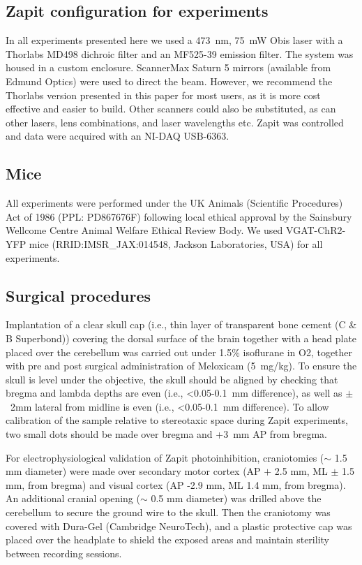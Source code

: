\documentclass[9pt,lineno]{elife}
\begin{document}
\subsection{Zapit configuration for experiments}
In all experiments presented here we used a 473~nm, 75~mW Obis laser with a Thorlabs MD498 dichroic filter and an MF525-39 emission filter.
The system was housed in a custom enclosure.
ScannerMax Saturn 5 mirrors (available from Edmund Optics) were used to direct the beam.
However, we recommend the Thorlabs version presented in this paper for most users, as it is more cost effective and easier to build.
Other scanners could also be substituted, as can other lasers, lens combinations, and laser wavelengths etc.
Zapit was controlled and data were acquired with an NI-DAQ USB-6363.

\subsection{Mice}
All experiments were performed under the UK Animals (Scientific Procedures) Act of 1986 (PPL: PD867676F) following local ethical approval by the Sainsbury Wellcome Centre Animal Welfare Ethical Review Body.
We used VGAT-ChR2-YFP mice (RRID:IMSR\_JAX:014548, Jackson Laboratories, USA) for all experiments.

\subsection{Surgical procedures}
Implantation of a clear skull cap (i.e., thin layer of transparent bone cement (C \& B Superbond)) covering the dorsal surface of the brain together with a head plate placed over the cerebellum was carried out under 1.5\% isoflurane in O2, together with pre and post surgical administration of Meloxicam (5~mg/kg).
To ensure the skull is level under the objective, the skull should be aligned by checking that bregma and lambda depths are even (i.e., <0.05-0.1~mm difference), as well as $\pm$~2mm lateral from midline is even (i.e., <0.05-0.1~mm difference).
To allow calibration of the sample relative to stereotaxic space during Zapit experiments, two small dots should be made over bregma and +3~mm AP from bregma.

For electrophysiological validation of Zapit photoinhibition, craniotomies ($\sim$ 1.5 mm diameter) were made over secondary motor cortex  (AP $+$ 2.5 mm, ML $\pm$ 1.5 mm, from bregma) and visual cortex (AP -2.9 mm, ML 1.4 mm, from bregma).
An additional cranial opening ($\sim$ 0.5 mm diameter) was drilled above the cerebellum to secure the ground wire to the skull.
Then the craniotomy was covered with Dura-Gel (Cambridge NeuroTech), and a plastic protective cap was placed over the headplate to shield the exposed areas and maintain sterility between recording sessions.
\end{document}
